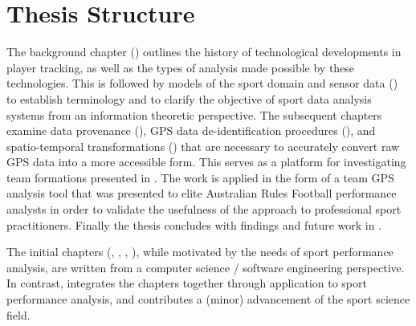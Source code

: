 \section{Thesis Structure}

The background chapter () outlines the history of technological developments in player tracking, as well as the types of analysis made possible by these technologies. This is followed by models of the sport domain and sensor data () to establish terminology and to clarify the objective of sport data analysis systems from an information theoretic perspective. The subsequent chapters examine data provenance (), GPS data de-identification procedures (), and spatio-temporal transformations () that are necessary to accurately convert raw GPS data into a more accessible form. This serves as a platform for investigating team formations presented in . The work is applied in the form of a team GPS analysis tool that was presented to elite Australian Rules Football performance analysts in order to validate the usefulness of the approach to professional sport practitioners. Finally the thesis concludes with findings and future work in .

The initial chapters (, , , ), while motivated by the needs of sport performance analysis, are written from a computer science / software engineering perspective. In contrast,  integrates the chapters together through application to sport performance analysis, and contributes a (minor) advancement of the sport science field.
